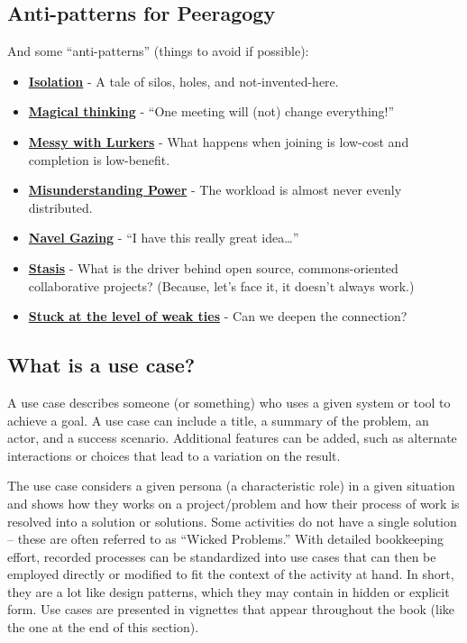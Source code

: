 \subsection{Anti-patterns for Peeragogy}

And some ``anti-patterns'' (things to avoid if possible):

\begin{itemize}
\item
  \textbf{\href{http://peeragogy.org/antipatterns/isolation/}{Isolation}} - A
  tale of silos, holes, and not-invented-here.
\item
  \textbf{\href{http://peeragogy.org/antipatterns/magical-thinking/}{Magical
  thinking}} - ``One meeting will (not) change everything!''
\item
  \textbf{\href{http://peeragogy.org/antipatterns/co-learning-messy-with-lurkers/}{Messy
  with Lurkers}} - What happens when joining is low-cost and completion
  is low-benefit.
\item
  \textbf{\href{http://peeragogy.org/antipatterns/misunderstanding-power/}{Misunderstanding
  Power}} - The workload is almost never evenly distributed.
\item
  \textbf{\href{http://peeragogy.org/antipatterns/navel-gazing/}{Navel Gazing}} -
  ``I have this really great idea\ldots{}''
\item
  \textbf{\href{http://peeragogy.org/antipatterns/stasis/}{Stasis}} - What is the
  driver behind open source, commons-oriented collaborative projects?
  (Because, let's face it, it doesn't always work.)
\item
  \textbf{\href{http://peeragogy.org/antipatterns/stuck-at-the-level-of-weak-ties/}{Stuck
  at the level of weak ties}} - Can we deepen the connection?
\end{itemize}
\subsection{What is a use case?}

A use case describes someone (or something) who uses a given system or
tool to achieve a goal. A use case can include a title, a summary of the
problem, an actor, and a success scenario. Additional features can be
added, such as alternate interactions or choices that lead to a
variation on the result.

The use case considers a given persona (a characteristic role) in a
given situation and shows how they works on a project/problem and how
their process of work is resolved into a solution or solutions. Some
activities do not have a single solution -- these are often referred to
as ``Wicked Problems.'' With detailed bookkeeping effort, recorded
processes can be standardized into use cases that can then be employed
directly or modified to fit the context of the activity at hand. In
short, they are a lot like design patterns, which they may contain in
hidden or explicit form. Use cases are presented in vignettes that
appear throughout the book (like the one at the end of this section).

